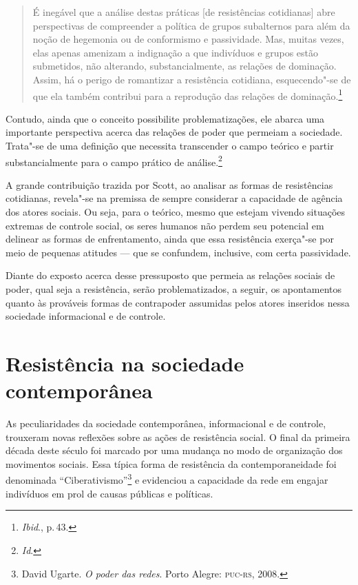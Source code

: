\begin{quote}
É inegável que a análise destas práticas {[}de resistências
cotidianas{]} abre perspectivas de compreender a política de grupos
subalternos para além da noção de hegemonia ou de conformismo e
passividade. Mas, muitas vezes, elas apenas amenizam a indignação a que
indivíduos e grupos estão submetidos, não alterando, substancialmente,
as relações de dominação. Assim, há o perigo de romantizar a resistência
cotidiana, esquecendo"-se de que ela também contribui para a reprodução
das relações de dominação.\footnote{\textit{Ibid}., p.\,43.}
\end{quote}

Contudo, ainda que o conceito possibilite problematizações, ele abarca
uma importante perspectiva acerca das relações de poder que permeiam a
sociedade. Trata"-se de uma definição que necessita transcender o campo
teórico e partir substancialmente para o campo prático de análise.\footnote{\textit{Id}.}

A grande contribuição trazida por Scott, ao analisar as formas de
resistências cotidianas, revela"-se na premissa de sempre considerar a
capacidade de agência dos atores sociais. Ou seja, para o teórico, mesmo
que estejam vivendo situações extremas de controle social, os seres
humanos não perdem seu potencial em delinear as formas de enfrentamento,
ainda que essa resistência exerça"-se por meio de pequenas atitudes ---
que se confundem, inclusive, com certa passividade.

Diante do exposto acerca desse pressuposto que permeia as relações
sociais de poder, qual seja a resistência, serão problematizados, a
seguir, os apontamentos quanto às prováveis formas de contrapoder
assumidas pelos atores inseridos nessa sociedade informacional e de
controle.

\section{Resistência na sociedade contemporânea}

As peculiaridades da sociedade contemporânea, informacional e de
controle, trouxeram novas reflexões sobre as ações de resistência
social. O final da primeira década deste século foi marcado por uma
mudança no modo de organização dos movimentos sociais. Essa típica forma
de resistência da contemporaneidade foi denominada ``Ciberativismo''\footnote{David Ugarte. \textit{O poder das redes}. Porto Alegre: \textsc{puc-rs}, 2008.} e evidenciou a capacidade da rede em engajar indivíduos
em prol de causas públicas e políticas.

